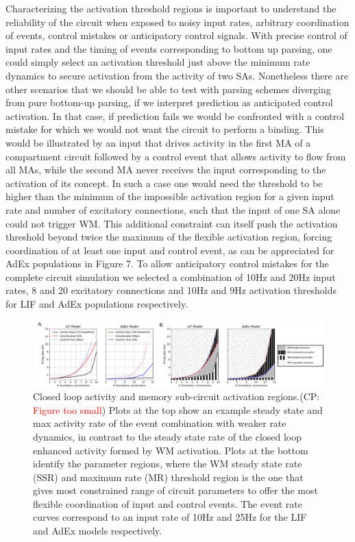 \documentclass[10pt]{article}
\newcommand{\noteCP}[1]{(CP: \textcolor{red}{#1})}
\begin{document}
Characterizing the activation threshold regions is important to understand the reliability of the circuit when exposed to noisy input rates, arbitrary coordination of events, control mistakes or anticipatory control signals.
With precise control of input rates and the timing of events corresponding to bottom up parsing, one could simply select an activation threshold just above the minimum rate dynamics to secure activation from the activity of two SAs.
Nonetheless there are other scenarios that we should be able to test with parsing schemes diverging from pure bottom-up parsing, if we interpret prediction as anticipated control activation.
In that case, if prediction fails we would be confronted with a control mistake for which we would not want the circuit to perform a binding.
This would be illustrated by an input that drives activity in the first MA of a compartment circuit followed by a control event that allows activity to flow from all MAs, while the second MA never receives the input corresponding to the activation of its concept.
In such a case one would need the threshold to be higher than the minimum of the impossible activation region for a given input rate and number of excitatory connections, such that the input of one SA alone could not trigger WM.
This additional constraint can itself push the activation threshold beyond twice the maximum of the flexible activation region, forcing coordination of at least one input and control event, as can be appreciated for AdEx populations in Figure 7.
To allow anticipatory control mistakes for the complete circuit simulation we selected a combination of 10Hz and 20Hz input rates, 8 and 20 excitatory connections and 10Hz and 9Hz activation thresholds for LIF and AdEx populations respectively.

\begin{figure}[h!]
  \begin{center}
    \includegraphics[width=1.0\columnwidth]{figures/experiment_3/experiment_3}

    \caption{Closed loop activity and memory sub-circuit activation regions.\noteCP{Figure too small}
      Plots at the top show an example steady state and max activity rate of the event combination with weaker rate dynamics, in contrast to the steady state rate of the closed loop enhanced activity formed by WM activation.
      Plots at the bottom identify the parameter regions, where the WM steady state rate (SSR) and maximum rate (MR) threshold region is the one that gives most constrained range of circuit parameters to offer the most flexible coordination of input and control events.
      The event rate curves correspond to an input rate of 10Hz and 25Hz for the LIF and AdEx models respectively.}
    \label{197355}

  \end{center}
\end{figure}
\end{document}
